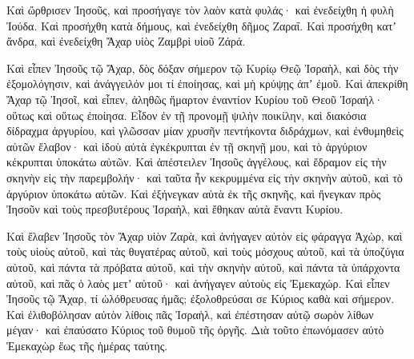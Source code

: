 {\par }{\PP {}Καὶ ὤρθρισεν Ἰησοῦς, καὶ προσήγαγε τὸν λαὸν κατὰ φυλάς· καὶ ἐνεδείχθη ἡ φυλὴ Ἰούδα.
Καὶ προσήχθη κατὰ δήμους, καὶ ἐνεδείχθη δῆμος Ζαραΐ. Καὶ προσήχθη κατʼ ἄνδρα,
καὶ ἐνεδείχθη Ἄχαρ υἱὸς Ζαμβρὶ υἱοῦ Ζάρά.
\par }{\PP {}Καὶ εἶπεν Ἰησοῦς τῷ Ἄχαρ, δὸς δόξαν σήμερον τῷ Κυρίῳ Θεῷ Ἰσραὴλ, καὶ δὸς τὴν ἐξομολόγησιν, καὶ ἀνάγγειλόν μοι τί ἐποίησας, καὶ μὴ κρύψῃς ἀπʼ ἐμοῦ.
Καὶ ἀπεκρίθη Ἄχαρ τῷ Ἰησοῖ, καὶ εἶπεν, ἀληθῶς ἥμαρτον ἐναντίον Κυρίου τοῦ Θεοῦ Ἰσραήλ· οὕτως καὶ οὕτως ἐποίησα.
Εἶδον ἐν τῇ προνομῇ ψιλὴν ποικίλην, καὶ διακόσια δίδραχμα ἀργυρίου, καὶ γλῶσσαν μίαν χρυσῆν πεντήκοντα διδράχμων, καὶ ἐνθυμηθεὶς αὐτῶν ἔλαβον· καὶ ἰδοὺ αὐτὰ ἐγκέκρυπται ἐν τῇ σκηνῇ μου, καὶ τὸ ἀργύριον κέκρυπται ὑποκάτω αὐτῶν.
Καὶ ἀπέστειλεν Ἰησοῦς ἀγγέλους, καὶ ἔδραμον εἰς τὴν σκηνὴν εἰς τὴν παρεμβολήν· καὶ ταῦτα ἦν κεκρυμμένα εἰς τὴν σκηνὴν αὐτοῦ, καὶ τὸ ἀργύριον ὑποκάτω αὐτῶν.
Καὶ ἐξήνεγκαν αὐτὰ ἐκ τῆς σκηνῆς, καὶ ἤνεγκαν πρὸς Ἰησοῦν καὶ τοὺς πρεσβυτέρους Ἰσραὴλ, καὶ ἔθηκαν αὐτὰ ἔναντι Κυρίου.
\par }{\PP {}Καὶ ἔλαβεν Ἰησοῦς τὸν Ἄχαρ υἱὸν Ζαρὰ, καὶ ἀνήγαγεν αὐτὸν εἰς φάραγγα Ἀχὼρ, καὶ τοὺς υἱοὺς αὐτοῦ, καὶ τὰς θυγατέρας αὐτοῦ, καὶ τοὺς μόσχους αὐτοῦ, καὶ τὰ ὑποζύγια αὐτοῦ, καὶ πάντα τὰ πρόβατα αὐτοῦ, καὶ τὴν σκηνὴν αὐτοῦ, καὶ πάντα τὰ ὑπάρχοντα αὐτοῦ, καὶ πᾶς ὁ λαὸς μετʼ αὐτοῦ· καὶ ἀνήγαγεν αὐτοὺς εἰς Ἐμεκαχώρ.
Καὶ εἶπεν Ἰησοῦς τῷ Ἄχαρ, τί ὠλόθρευσας ἡμᾶς; ἐξολοθρεύσαι σε Κύριος καθὰ καὶ σήμερον.
Καὶ ἐλιθοβόλησαν αὐτὸν λίθοις πᾶς Ἰσραὴλ, καὶ ἐπέστησαν αὐτῷ σωρὸν λίθων μέγαν· καὶ ἐπαύσατο Κύριος τοῦ θυμοῦ τῆς ὀργῆς. Διὰ τοῦτο ἐπωνόμασεν αὐτὸ Ἐμεκαχὼρ ἕως τῆς ἡμέρας ταύτης.

}
